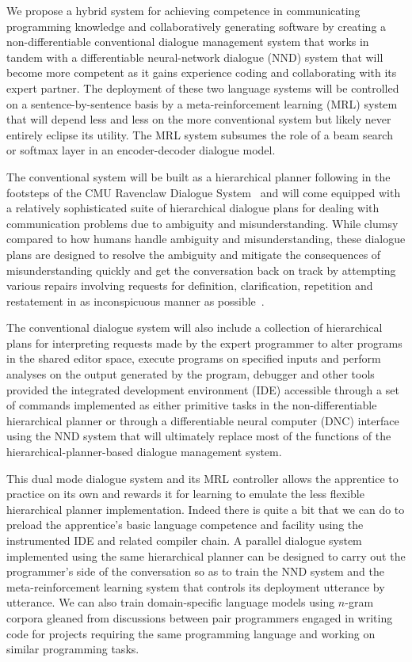 We propose a hybrid system for achieving competence in communicating programming knowledge and collaboratively generating software by creating a non-differentiable conventional dialogue management system that works in tandem with a differentiable neural-network dialogue (NND) system that will become more competent as it gains experience coding and collaborating with its expert partner. The deployment of these two language systems will be controlled on a sentence-by-sentence basis by a meta-reinforcement learning (MRL) system that will depend less and less on the more conventional system but likely never entirely eclipse its utility. The MRL system subsumes the role of a beam search or softmax layer in an encoder-decoder dialogue model. 


The conventional system will be built as a hierarchical planner following in the footsteps of the CMU Ravenclaw Dialogue System~\cite{BohusandRudnickyCSL-09} and will come equipped with a relatively sophisticated suite of hierarchical dialogue plans for dealing with communication problems due to ambiguity and misunderstanding. While clumsy compared to how humans handle ambiguity and misunderstanding, these dialogue plans are designed to resolve the ambiguity and mitigate the consequences of misunderstanding quickly and get the conversation back on track by attempting various repairs involving requests for definition, clarification, repetition and restatement in as inconspicuous manner as possible~\cite{BohusPhD-07}.

The conventional dialogue system will also include a collection of hierarchical plans for interpreting requests made by the expert programmer to alter programs in the shared editor space, execute programs on specified inputs and perform analyses on the output generated by the program, debugger and other tools provided the integrated development environment (IDE) accessible through a set of commands implemented as either primitive tasks in the non-differentiable hierarchical planner or through a differentiable neural computer (DNC) interface using the NND system that will ultimately replace most of the functions of the hierarchical-planner-based dialogue management system.

This dual mode dialogue system and its MRL controller allows the apprentice to practice on its own and rewards it for learning to emulate the less flexible hierarchical planner implementation. Indeed there is quite a bit that we can do to preload the apprentice’s basic language competence and facility using the instrumented IDE and related compiler chain. A parallel dialogue system implemented using the same hierarchical planner can be designed to carry out the programmer’s side of the conversation so as to train the NND system and the meta-reinforcement learning system that controls its deployment utterance by utterance. We can also train domain-specific language models using $n$-gram corpora gleaned from discussions between pair programmers engaged in writing code for projects requiring the same programming language and working on similar programming tasks.

